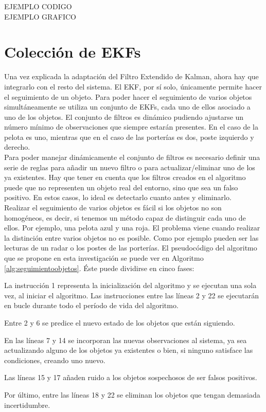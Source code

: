 {EJEMPLO CODIGO}\\
{EJEMPLO GRAFICO}\\




\section{Colección de EKFs}
\label{sec:colecciondeekfs}

Una vez explicada la adaptación del Filtro Extendido de Kalman, ahora hay que integrarlo con el resto del sistema. El EKF, por sí solo, únicamente permite hacer el seguimiento de un objeto. Para poder hacer el seguimiento de varios objetos simultáneamente se utiliza un conjunto de EKFs, cada uno de ellos asociado a uno de los objetos. El conjunto de filtros es dinámico pudiendo ajustarse un número mínimo de observaciones que siempre estarán presentes. En el caso de la pelota es uno, mientras que en el caso de las porterías es dos, poste izquierdo y derecho.\\



Para poder manejar dinámicamente el conjunto de filtros es necesario definir una serie de reglas para añadir un nuevo filtro o para actualizar/eliminar uno de los ya existentes. Hay que tener en cuenta que los filtros creados en el algoritmo puede que no representen un objeto real del entorno, sino que sea un falso positivo. En estos casos, lo ideal es detectarlo cuanto antes y eliminarlo.\\

Realizar el seguimiento de varios objetos es fácil si los objetos no son homogéneos, es decir, si tenemos un método capaz de distinguir cada uno de ellos. Por ejemplo, una pelota azul y una roja. El problema viene cuando realizar la distinción entre varios objetos no es posible. Como por ejemplo pueden ser las lecturas de un radar o los postes de las porterías. El pseudocódigo del algoritmo que se propone en esta investigación se puede ver en Algoritmo \ref{alg:seguimientoobjetos}. Éste puede dividirse en cinco fases:

\begin{packed_item}
\item La instrucción 1 representa la inicialización del algoritmo y se ejecutan una sola vez, al iniciar el algoritmo. Las instrucciones entre las líneas 2 y 22 se ejecutarán en bucle durante todo el período de vida del algoritmo.
\item Entre 2 y 6 se predice el nuevo estado de los objetos que están siguiendo.
\item En las líneas 7 y 14 se incorporan las nuevas observaciones al sistema, ya sea actualizando alguno de los objetos ya existentes o bien, si ninguno satisface las condiciones, creando uno nuevo.
\item Las líneas 15 y 17 añaden ruido a los objetos sospechosos de ser falsos positivos.
\item Por último, entre las líneas 18 y 22 se eliminan los objetos que tengan demasiada incertidumbre.
\end{packed_item}

